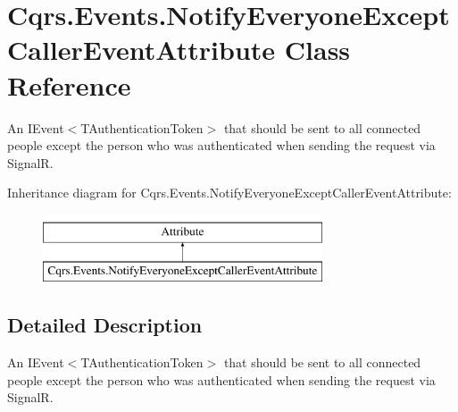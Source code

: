 \hypertarget{classCqrs_1_1Events_1_1NotifyEveryoneExceptCallerEventAttribute}{}\section{Cqrs.\+Events.\+Notify\+Everyone\+Except\+Caller\+Event\+Attribute Class Reference}
\label{classCqrs_1_1Events_1_1NotifyEveryoneExceptCallerEventAttribute}


An I\+Event$<$\+T\+Authentication\+Token$>$ that should be sent to all connected people except the person who was authenticated when sending the request via SignalR.  


Inheritance diagram for Cqrs.\+Events.\+Notify\+Everyone\+Except\+Caller\+Event\+Attribute\+:\begin{figure}[H]
\begin{center}
\leavevmode
\includegraphics[height=2.000000cm]{classCqrs_1_1Events_1_1NotifyEveryoneExceptCallerEventAttribute}
\end{center}
\end{figure}


\subsection{Detailed Description}
An I\+Event$<$\+T\+Authentication\+Token$>$ that should be sent to all connected people except the person who was authenticated when sending the request via SignalR. 


